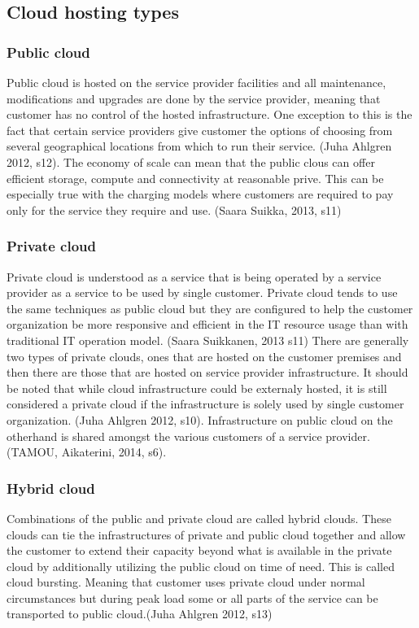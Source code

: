 \documentclass{article}
\begin{document}
\subsection{Cloud hosting types}
\subsubsection{Public cloud}
Public cloud is hosted on the service provider facilities and all maintenance, modifications and upgrades are done by the service provider, meaning that customer has no control of the hosted infrastructure. One exception to this is the fact that certain service providers give customer the options of choosing from several geographical locations from which to run their service. (Juha Ahlgren 2012, s12).
The economy of scale can mean that the public clous can offer efficient storage, compute and connectivity at reasonable prive. This can be especially true with the charging models where customers are required to pay only for the service they require and use. (Saara Suikka, 2013, s11)
\subsubsection{Private cloud}
Private cloud is understood as a service that is being operated by a service provider as a service to be used by single customer. Private cloud tends to use the same techniques as public cloud but they are configured to help the customer organization be more responsive and efficient in the IT resource usage than with traditional IT operation model. (Saara Suikkanen, 2013 s11)
There are generally two types of private clouds, ones that are hosted on the customer premises and then there are those that are hosted on service provider infrastructure. It should be noted that while cloud infrastructure could be externaly hosted, it is still considered a private cloud if the infrastructure is solely used by single customer organization. (Juha Ahlgren 2012, s10).
Infrastructure on public cloud on the otherhand is shared amongst the various customers of a service provider. (TAMOU, Aikaterini, 2014, s6).
\subsubsection{Hybrid cloud}
Combinations of the public and private cloud are called hybrid clouds. These clouds can tie the infrastructures of private and public cloud together and allow the customer to extend their capacity beyond what is available in the private cloud by additionally utilizing the public cloud on time of need. This is called cloud bursting. Meaning that customer uses private cloud under normal circumstances but during peak load some or all parts of the service can be transported to public cloud.(Juha Ahlgren 2012, s13)
\end{document}
